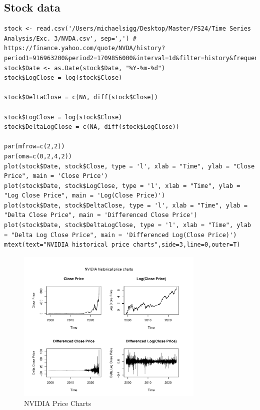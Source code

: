 \subsection{Stock data}

\begin{lstlisting}
stock <- read.csv('/Users/michaelsigg/Desktop/Master/FS24/Time Series Analysis/Exc. 3/NVDA.csv', sep=',') # https://finance.yahoo.com/quote/NVDA/history?period1=916963200&period2=1709856000&interval=1d&filter=history&frequency=1d&includeAdjustedClose=true
stock$Date <- as.Date(stock$Date, "%Y-%m-%d")
stock$LogClose = log(stock$Close)

stock$DeltaClose = c(NA, diff(stock$Close))

stock$LogClose = log(stock$Close)
stock$DeltaLogClose = c(NA, diff(stock$LogClose))

par(mfrow=c(2,2))
par(oma=c(0,2,4,2))
plot(stock$Date, stock$Close, type = 'l', xlab = "Time", ylab = "Close Price", main = 'Close Price')
plot(stock$Date, stock$LogClose, type = 'l', xlab = "Time", ylab = "Log Close Price", main = 'Log(Close Price)')
plot(stock$Date, stock$DeltaClose, type = 'l', xlab = "Time", ylab = "Delta Close Price", main = 'Differenced Close Price')
plot(stock$Date, stock$DeltaLogClose, type = 'l', xlab = "Time", ylab = "Delta Log Close Price", main = 'Differenced Log(Close Price)')
mtext(text="NVIDIA historical price charts",side=3,line=0,outer=T)
\end{lstlisting}

\begin{figure}[H]
\centering
\includegraphics[width=0.8\textwidth]{plots/NVD.pdf}
\caption{NVIDIA Price Charts}
\end{figure}

